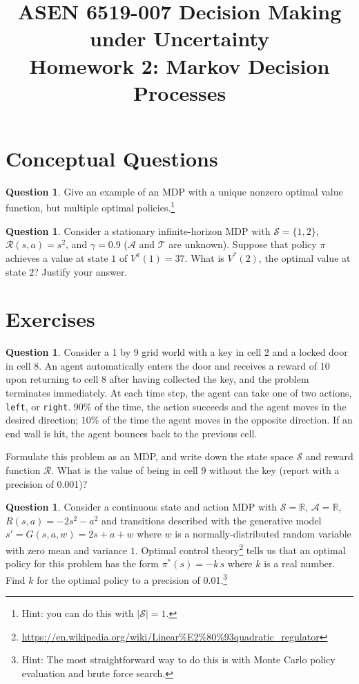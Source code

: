 \documentclass{article}
\title{ASEN 6519-007 Decision Making under Uncertainty\\
       Homework 2: Markov Decision Processes}
\theoremstyle{definition}
\newtheorem{question}[thm]{Question}
\newcommand{\reals}{\mathbb{R}}
\begin{document}
\maketitle

\section{Conceptual Questions}

\begin{question}
    Give an example of an MDP with a unique nonzero optimal value function, but multiple optimal policies.\footnote{Hint: you can do this with $|\mathcal{S}| = 1$.}
\end{question}

\begin{question}
    Consider a stationary infinite-horizon MDP with $\mathcal{S} = \{1,2\}$, $\mathcal{R}(s, a) = s^2$, and $\gamma = 0.9$ ($\mathcal{A}$ and $\mathcal{T}$ are unknown). Suppose that policy $\pi$ achieves a value at state $1$ of $V^\pi(1) = 37$. What is $V^*(2)$, the optimal value at state $2$? Justify your answer.
\end{question}

\section{Exercises}

\begin{question}
    Consider a 1 by 9 grid world with a key in cell 2 and a locked door in cell 8. An agent automatically enters the door and receives a reward of 10 upon returning to cell 8 after having collected the key, and the problem terminates immediately. At each time step, the agent can take one of two actions, \texttt{left}, or \texttt{right}. 90\% of the time, the action succeeds and the agent moves in the desired direction; 10\% of the time the agent moves in the opposite direction. If an end wall is hit, the agent bounces back to the previous cell.

    Formulate this problem as an MDP, and write down the state space $\mathcal{S}$ and reward function $\mathcal{R}$. What is the value of being in cell 9 without the key (report with a precision of 0.001)?

\end{question}

\begin{question}
    Consider a continuous state and action MDP with $\mathcal{S} = \reals$, $\mathcal{A} = \reals$, $R(s, a) = - 2s^2 - a^2$ and transitions described with the generative model $s' = G(s, a, w) = 2s + a + w$ where $w$ is a normally-distributed random variable with zero mean and variance $1$. Optimal control theory\footnote{\url{https://en.wikipedia.org/wiki/Linear\%E2\%80\%93quadratic_regulator}} tells us that an optimal policy for this problem has the form $\pi^*(s) = -k\,s$ where $k$ is a real number. Find $k$ for the optimal policy to a precision of 0.01.\footnote{Hint: The most straightforward way to do this is with Monte Carlo policy evaluation and brute force search.}
\end{question}
\end{document}
